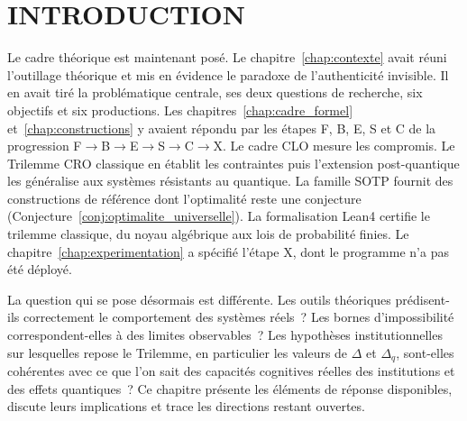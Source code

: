 

\section{INTRODUCTION}
\label{sec:introduction_resultats_discussions}
\begin{sloppypar}

Le cadre th\'eorique est maintenant pos\'e. Le chapitre~\ref{chap:contexte}
avait r\'euni l'outillage th\'eorique et mis en \'evidence le paradoxe de l'authenticit\'e
invisible. Il en avait tir\'e la probl\'ematique centrale, ses deux questions de recherche,
six objectifs et six productions. Les chapitres~\ref{chap:cadre_formel} et~\ref{chap:constructions} y avaient
r\'epondu par les \'etapes F, B, E, S et C de la progression
F$\to$B$\to$E$\to$S$\to$C$\to$X. Le cadre CLO mesure les compromis. Le Trilemme CRO
classique en \'etablit les contraintes puis l'extension post-quantique les g\'en\'eralise
aux syst\`emes r\'esistants au quantique. La famille SOTP fournit des constructions de
r\'ef\'erence dont l'optimalit\'e reste une conjecture
(Conjecture~\ref{conj:optimalite_universelle}). La formalisation Lean4 certifie le
trilemme classique, du noyau alg\'ebrique aux lois de probabilit\'e finies. Le
chapitre~\ref{chap:experimentation} a sp\'ecifi\'e l'\'etape X, dont le programme n'a pas
\'et\'e d\'eploy\'e.

La question qui se pose d\'esormais est diff\'erente. Les outils
th\'eoriques pr\'edisent-ils correctement le comportement des syst\`emes
r\'eels~? Les bornes d'impossibilit\'e correspondent-elles \`a des
limites observables~? Les hypoth\`eses institutionnelles sur lesquelles
repose le Trilemme, en particulier les valeurs de $\Delta$ et $\Delta_q$,
sont-elles coh\'erentes avec ce que l'on sait des capacit\'es cognitives
r\'eelles des institutions et des effets quantiques~? Ce chapitre
pr\'esente les \'el\'ements de r\'eponse disponibles, discute leurs
implications et trace les directions restant ouvertes.


\end{sloppypar}
